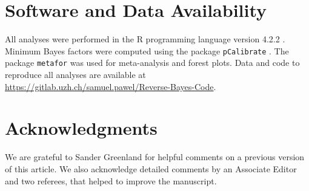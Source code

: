 \section*{Software and Data Availability}
All analyses were performed in the R programming language version 4.2.2
\citep{R}. Minimum Bayes factors were computed using the package
\texttt{pCalibrate} \citep{Held2018}. The package \texttt{metafor}
\citep{Viechtbauer2010} was used for meta-analysis and forest plots. Data and
code to reproduce all analyses are available at
\url{https://gitlab.uzh.ch/samuel.pawel/Reverse-Bayes-Code}.

\section*{Acknowledgments}
We are grateful to Sander Greenland for helpful comments on a previous version
of this article. We also acknowledge detailed comments by an Associate Editor
and two referees, that helped to improve the manuscript.


